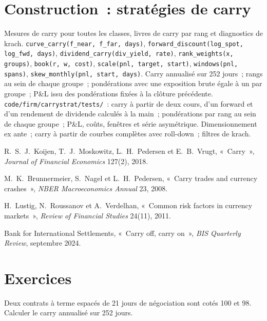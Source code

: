 \section{Construction~: stratégies de carry}\label{bld:s1:carry-across-asset-classes:carrystrat}

\begin{build}
 Mesures de carry pour toutes les classes, livres de carry par rang et diagnostics de krach.
 \texttt{curve\_carry(f\_near, f\_far, days)}, \texttt{forward\_discount(log\_spot, log\_fwd, days)},
\texttt{dividend\_carry(div\_yield, rate)}, \texttt{rank\_weights(x, groups)}, \texttt{book(r, w, cost)}, \texttt{scale(pnl, target, start)}, \texttt{windows(pnl, spans)},
\texttt{skew\_monthly(pnl, start, days)}.
 Carry annualisé sur 252 jours~; rangs au sein de chaque groupe~; pondérations avec une exposition brute égale à un par groupe~; P\&L issu des pondérations fixées à la clôture précédente.
 \texttt{code/firm/carrystrat/tests/}~: carry à partir de deux cours, d'un forward et d'un rendement de dividende calculés à la main~; pondérations par rang au sein de chaque groupe~;
P\&L, coûts, fenêtres et série asymétrique.
 Dimensionnement ex ante~; carry à partir de courbes complètes avec roll-down~; filtres de krach.
\end{build}

\begin{omsources}
\item R.~S.~J.~Koijen, T.~J.~Moskowitz, L.~H.~Pedersen et E.~B.~Vrugt, «~Carry~», \emph{Journal of Financial Economics} 127(2), 2018.
\item M.~K.~Brunnermeier, S.~Nagel et L.~H.~Pedersen, «~Carry trades and currency crashes~», \emph{NBER Macroeconomics Annual} 23, 2008.
\item H.~Lustig, N.~Roussanov et A.~Verdelhan, «~Common risk factors in currency markets~», \emph{Review of Financial Studies} 24(11), 2011.
\item Bank for International Settlements, «~Carry off, carry on~», \emph{BIS Quarterly Review}, septembre 2024.
\end{omsources}

\section{Exercices}

\begin{exercise}[$\star$]\label{exo:s1:carry-across-asset-classes:1}
Deux contrats à terme espacés de 21 jours de négociation sont cotés 100 et 98. Calculer le carry annualisé sur 252 jours.
\end{exercise}

